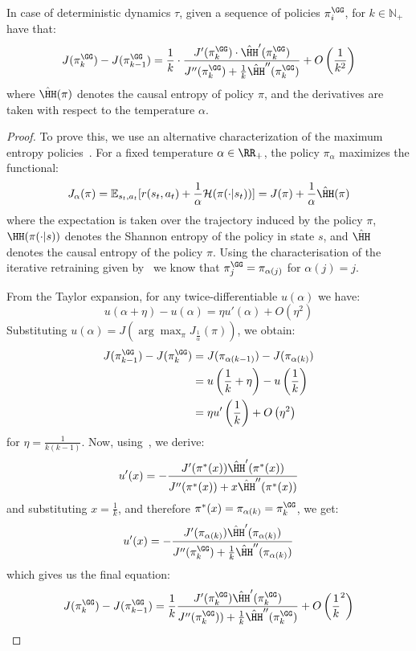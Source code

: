 \begin{corollary}
    In case of deterministic dynamics $\tau$, given a sequence of policies $\pi^\GG_i$, for $k \in \mathbb{N}_+$ have that:
    \[
    J(\pi^\GG_{k}) - J(\pi^\GG_{k-1}) = \frac{1}{{k}} \cdot \frac{J'(\pi^\GG_{k}) \cdot \hat{\HH}'(\pi^\GG_{k})}{J''(\pi^\GG_k) + \frac{1}{{k}} \hat{\HH}''(\pi^\GG_{k})} + O\left(\frac{1}{{k}^2}\right)
    \]
    where $\hat{\HH}(\pi)$ denotes the causal entropy of policy $\pi$, and the derivatives are taken with respect to the temperature $\alpha$.
\end{corollary}
\begin{proof}
    To prove this, we use an alternative characterization of the maximum entropy  policies~\citep{haarnoja_reinforcement_2017,levine_reinforcement_2018}. For a fixed temperature $\alpha \in \RR_+$, the policy $\pi_\alpha$ maximizes the functional:
    \[
    J_\alpha(\pi) = \mathbb{E}_{s_t, a_t}[r(s_t, a_t) + \frac{1}{\alpha} \mathcal{H}(\pi(\cdot|s_t))]= J(\pi) + \frac{1}{\alpha} \hat{\HH}(\pi)
    \]
    where the expectation is taken over the trajectory induced by the policy $\pi$, $\HH(\pi(\cdot|s))$ denotes the Shannon entropy of the policy in state $s$, and $\hat{\HH}$ denotes the causal entropy of the policy $\pi$. Using the characterisation of the iterative retraining given by~ we know that $\pi^\GG_j = \pi_{\alpha(j)}$ for $\alpha(j) = j$.

    From the Taylor expansion, for any twice-differentiable $u(\alpha)$ we have:
    \[
    u(\alpha + \eta) - u(\alpha) = \eta u'(\alpha) + O(\eta^2)
    \]
    Substituting $u(\alpha) = J(\arg\max_\pi J_{\frac{1}{\alpha}}(\pi))$, we obtain: 
    \begin{align*}
        J(\pi^\GG_{k-1}) - J(\pi^\GG_{k})
        &= J(\pi_{\alpha(k - 1)}) - J(\pi_{\alpha(k)}) \\
        &= u\left(\frac{1}{{k}} + \eta\right) - u\left(\frac{1}{{k}}\right)  \\
        &= \eta u'\left(\frac{1}{{k}}\right) + O\left(\eta^2\right)
    \end{align*}
    for $\eta = \frac{1}{k({k-1})}$. Now, using~, we derive:
    \[
    u'(x) = -\frac{J'(\pi^*(x)) \hat{\HH}'(\pi^*(x))}{J''(\pi^*(x)) + x \hat{\HH}''(\pi^*(x))}
    \]
    and substituting $x = \frac{1}{{k}}$, and therefore $\pi^*(x) = \pi_{\alpha(k)} = \pi^\GG_k$, we get:
    \[
    u'(x) = -\frac{J'(\pi_{\alpha(k)}) \hat{\HH}'(\pi_{\alpha(k)})}{J''(\pi^\GG_k) + \frac{1}{{k}} \hat{\HH}''(\pi_{\alpha(k)})}
    \]
    which gives us the final equation:
    \[
    J(\pi^\GG_{k}) - J(\pi^\GG_{k-1}) = \frac{1}{{k}} \frac{J'(\pi^\GG_{k}) \hat{\HH}'(\pi^\GG_{k})}{J''(\pi^\GG_{k})) + \frac{1}{{k}} \hat{\HH}''(\pi^\GG_{k})} + O\left(\frac{1}{k}^2\right)
    \]
\end{proof}
